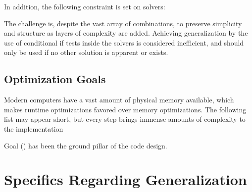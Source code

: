 In addition, the following constraint is set on solvers:


The challenge is, despite the vast array of combinations, to preserve simplicity and structure as layers of complexity are added. Achieving generalization by the use of conditional if tests inside the solvers is considered inefficient, and should only be used if no other solution is apparent or exists.

\subsection{Optimization Goals}
\label{sec:optGoals}

Modern computers have a vast amount of physical memory available, which makes runtime optimizations favored over memory optimizations. The following list may appear short, but every step brings immense amounts of complexity to the implementation


Goal (\label{it::opt::noIF}) has been the ground pillar of the code design. 

\clearpage
\section{Specifics Regarding Generalization}
\label{sec:specGen}

